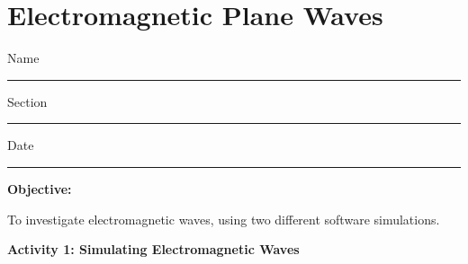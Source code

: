\setcounter{equation}{0}
\setcounter{figure}{0}

\section{Electromagnetic Plane Waves}

Name \rule{2.0in}{0.1pt}\hfill{}Section \rule{1.0in}{0.1pt}\hfill{}Date
\rule{1.0in}{0.1pt}

\textbf{Objective:} 

To investigate electromagnetic waves, using two different software simulations.



\textbf{Activity 1: Simulating Electromagnetic Waves}

